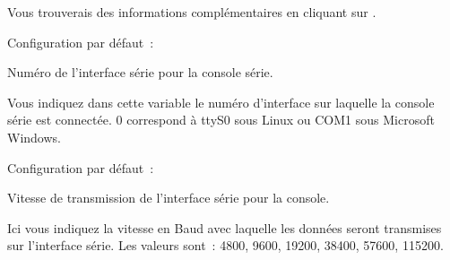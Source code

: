 \begin{description}

    Vous trouverais des informations complémentaires en cliquant sur
    .


    Configuration par défaut~: 

   {Numéro de l'interface série pour la console série.
	
	Vous indiquez dans cette variable le numéro d'interface sur laquelle
	la console série est connectée. 0 correspond à ttyS0 sous Linux ou COM1
	sous Microsoft Windows.}


    Configuration par défaut~: 

    {Vitesse de transmission de l'interface série pour la console.

    Ici vous indiquez la vitesse en Baud avec laquelle les données seront
    transmises sur l'interface série. Les valeurs sont~: 4800, 9600, 19200,
    38400, 57600, 115200.}

\end{description}
